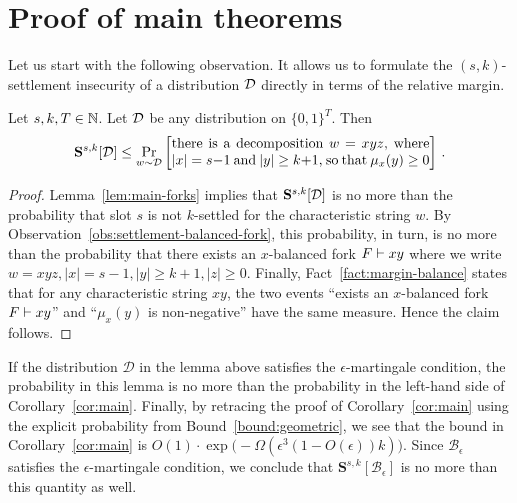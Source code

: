 \section{Proof of main theorems}\label{sec:thm-proofs}


Let us start with the following observation.
It allows us to formulate the
$(s, k)$-settlement insecurity of a distribution $\mathcal{D}$
directly in terms of the relative margin.

\begin{lemma}\label{lemma:settlement-margin}
  Let $s, k, T \in \mathbb{N}$. 
  Let $\mathcal{D}$ be any distribution on $\{0,1\}^T$. 
  Then
  \[
    \mathbf{S}^{s,k}[\Distribution] \leq
      \Pr_{w \sim \Distribution} \left[\parbox{65mm}{
          there is a decomposition $w = x y z$, 
          where $|x| = s - 1$ and $|y| \geq k + 1$, 
          so that $\mu_x(y) \geq 0$
      }\right]
    \,.
  \]
\end{lemma}
\begin{proof}
  Lemma~\ref{lem:main-forks} implies that 
  $\mathbf{S}^{s,k}[\mathcal{D}]$ is no more than 
  the probability that slot $s$ is not $k$-settled 
  for the characteristic string $w$. 
  By Observation~\ref{obs:settlement-balanced-fork}, 
  this probability, in turn, is no more than 
  the probability that there exists an $x$-balanced fork 
  $F \vdash xy$
  where we write $w = xyz, |x| = s - 1, |y| \geq k + 1, |z| \geq 0$. 
  Finally, Fact~\ref{fact:margin-balance} states that 
  for any characteristic string $xy$, 
  the two events ``exists an $x$-balanced fork $F \vdash xy$'' 
  and ``$\mu_x(y)$ is non-negative'' have the same measure. 
  Hence the claim follows. 
\end{proof}

If the distribution $\mathcal{D}$ in the lemma above 
satisfies the $\epsilon$-martingale condition, 
the probability in this lemma is no more than the probability 
in the left-hand side of Corollary~\ref{cor:main}. 
Finally, by retracing the proof of Corollary~\ref{cor:main} 
using the explicit probability from Bound~\ref{bound:geometric}, 
we see that the bound in Corollary~\ref{cor:main} is 
$O(1) \cdot \exp\bigl(-\Omega(\epsilon^3 (1 - O(\epsilon))k)\bigr)$. 
Since $\mathcal{B}_\epsilon$ satisfies the $\epsilon$-martingale condition, 
we conclude that $\mathbf{S}^{s,k}[\mathcal{B}_\epsilon]$ is no more than 
this quantity as well.


